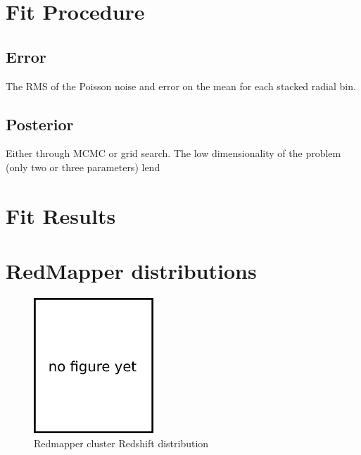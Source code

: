 \documentclass[twocolumn]{article}
\begin{document}
\section{Fit Procedure}

\subsection{Error}
The RMS of the Poisson noise and error on the mean for each stacked radial bin.

\subsection{Posterior}
Either through MCMC or grid search. The low dimensionality of the
problem (only two or three parameters) lend 

\section{Fit Results}

\clearpage
\appendix


\onecolumn
\section{RedMapper distributions}

\begin{figure}[H]
  \center\includegraphics[width=0.4\textwidth]{figs/404.png}
  \caption{Redmapper cluster Redshift distribution}
  \label{fig:redmapper_redshift}
\end{figure}
\end{document}
